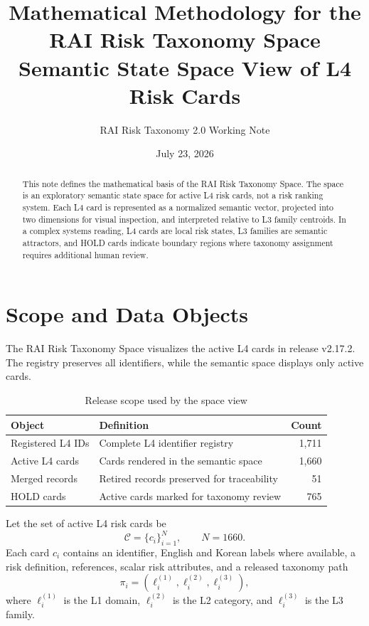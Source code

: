 \documentclass[11pt,a4paper]{article}
\title{\textbf{Mathematical Methodology for the RAI Risk Taxonomy Space}\\
\large Semantic State Space View of L4 Risk Cards}
\author{RAI Risk Taxonomy 2.0 Working Note}
\date{July 23, 2026}
\begin{document}
\maketitle

\begin{abstract}
This note defines the mathematical basis of the RAI Risk Taxonomy Space. The space is an exploratory semantic state space for active L4 risk cards, not a risk ranking system. Each L4 card is represented as a normalized semantic vector, projected into two dimensions for visual inspection, and interpreted relative to L3 family centroids. In a complex systems reading, L4 cards are local risk states, L3 families are semantic attractors, and HOLD cards indicate boundary regions where taxonomy assignment requires additional human review.
\end{abstract}

\section{Scope and Data Objects}

The RAI Risk Taxonomy Space visualizes the active L4 cards in release v2.17.2. The registry preserves all identifiers, while the semantic space displays only active cards.

\begin{table}[h]
\centering
\caption{Release scope used by the space view}
\begin{tabular}{llr}
\toprule
Object & Definition & Count \\
\midrule
Registered L4 IDs & Complete L4 identifier registry & 1,711 \\
Active L4 cards & Cards rendered in the semantic space & 1,660 \\
Merged records & Retired records preserved for traceability & 51 \\
HOLD cards & Active cards marked for taxonomy review & 765 \\
\bottomrule
\end{tabular}
\end{table}

Let the set of active L4 risk cards be
\begin{equation}
\mathcal{C}=\{c_i\}_{i=1}^{N}, \qquad N=1660.
\end{equation}
Each card $c_i$ contains an identifier, English and Korean labels where available, a risk definition, references, scalar risk attributes, and a released taxonomy path
\begin{equation}
\pi_i=(\ell^{(1)}_i,\ell^{(2)}_i,\ell^{(3)}_i),
\end{equation}
where $\ell^{(1)}_i$ is the L1 domain, $\ell^{(2)}_i$ is the L2 category, and $\ell^{(3)}_i$ is the L3 family.
\end{document}
